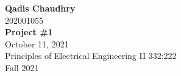 \documentclass[12pt]{article}
\begin{document}
    \begin{titlepage}
        \begin{center}
            \textbf{Qadis Chaudhry} \\
            \vspace{0.2cm}
            202001055 \\
            \vfill
            \textbf{Project \#1} \\
            \vspace{0.2cm}
            October 11, 2021 \\
            \vfill
            Principles of Electrical Engineering II 332:222 \\
            \vspace{0.2cm}
            Fall 2021
        \end{center}
    \end{titlepage}
\end{document}
